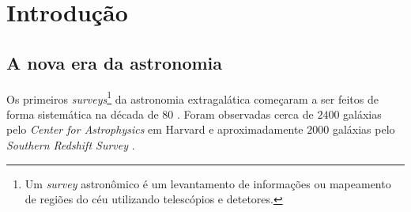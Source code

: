 


\chapter{Introdução}
\label{sec:Intro}


\section{A nova era da astronomia}
\label{sec:Intro:NovaEra}

Os primeiros {\em surveys}\footnote{Um {\em survey} astronômico é um
levantamento de informações ou mapeamento de regiões do céu utilizando
telescópios e detetores.} da astronomia extragalática começaram a ser feitos de
forma sistemática na década de 80 \citep{Huchra1988}. Foram observadas cerca de
$2400$ galáxias pelo {\em Center for Astrophysics} em Harvard \citep{Huchra1983}
e aproximadamente $2000$ galáxias pelo {\em Southern Redshift Survey}
\citep{DaCosta1988}.

